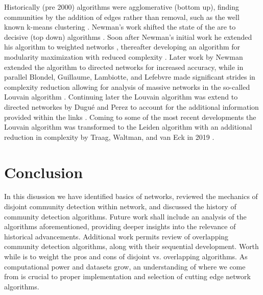 \documentclass[a4paper, 12pt, twocolumn]{article}
\begin{document}
Historically (pre 2000) algorithms were agglomerative (bottom up), finding communities by the addition of edges rather than removal, such as the well known k-means clustering \cite{least_squares_PCM, some_methods}. 
Newman's work shifted the state of the are to decisive (top down) algorithms \cite{com_struct_in_soc_and_bio}. 
Soon after Newman's initial work he extended his algorithm to weighted networks \cite{analysis_of_wnets}, thereafter developing an algorithm for modularity maximization with reduced complexity \cite{finding_comm_struct}.
Later work by Newman extended the algorithm to directed networks \cite{com_struct_indir} for increased accuracy, while in parallel Blondel, Guillaume, Lambiotte, and Lefebvre made significant strides in complexity reduction allowing for analysis of massive networks in the so-called Louvain algorithm \cite{louvain}. 
Continuing later the Louvain algorithm was extend to directed networkes by Dugu{\'e} and Perez to account for the additional information provided within the links \cite{directed_louvain}. 
Coming to some of the most recent developments the Louvain algorithm was transformed to the Leiden algorithm with an additional reduction in complexity by Traag, Waltman, and van Eck in 2019 \cite{louvain_2_leiden}. 


\section{Conclusion}

In this disussion we have identified basics of networks, reviewed the mechanics of disjoint community detection within network, and discussed the history of community detection algorithms. 
Future work shall include an analysis of the algorithms aforementioned, providing deeper insights into the relevance of historical advancements. 
Additional work permits review of overlapping community detection algorithms, along with their sequential development. 
Worth while is to weight the pros and cons of disjoint vs. overlapping algorithms. 
As computational power and datasets grow, an understanding of where we come from is crucial to proper implementation and selection of cutting edge network algorithms.

{}


\end{document}
